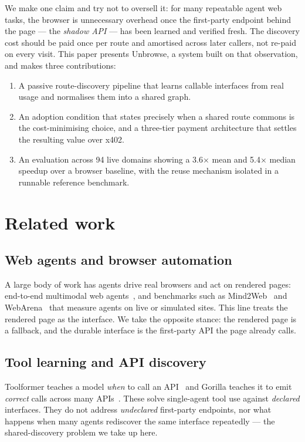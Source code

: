 \documentclass[11pt]{article}
\begin{document}
We make one claim and try not to oversell it: for many repeatable agent web
tasks, the browser is unnecessary overhead once the first-party endpoint behind
the page --- the \emph{shadow API} --- has been learned and verified fresh. The
discovery cost should be paid once per route and amortised across later callers,
not re-paid on every visit. This paper presents
Unbrowse, a system built on that observation, and makes three contributions:
\begin{enumerate}[leftmargin=1.6em]
  \item A passive route-discovery pipeline that learns callable interfaces from
  real usage and normalises them into a shared graph.
  \item An adoption condition that states precisely when a shared route commons is
  the cost-minimising choice, and a three-tier payment architecture that settles
  the resulting value over x402.
  \item An evaluation across 94 live domains showing a 3.6$\times$ mean and
  5.4$\times$ median speedup over a browser baseline, with the reuse mechanism
  isolated in a runnable reference benchmark.
\end{enumerate}

\section{Related work}
\subsection{Web agents and browser automation}
A large body of work has agents drive real browsers and act on rendered pages:
end-to-end multimodal web agents~\cite{webvoyager}, and benchmarks such as
Mind2Web~\cite{mind2web} and WebArena~\cite{webarena} that measure agents on live
or simulated sites. This line treats the rendered page as the interface. We take
the opposite stance: the rendered page is a fallback, and the durable interface is
the first-party API the page already calls.

\subsection{Tool learning and API discovery}
Toolformer teaches a model \emph{when} to call an API~\cite{toolformer} and Gorilla
teaches it to emit \emph{correct} calls across many APIs~\cite{gorilla}. These
solve single-agent tool use against \emph{declared} interfaces. They do not address
\emph{undeclared} first-party endpoints, nor what happens when many agents
rediscover the same interface repeatedly --- the shared-discovery problem we take
up here.
\end{document}
